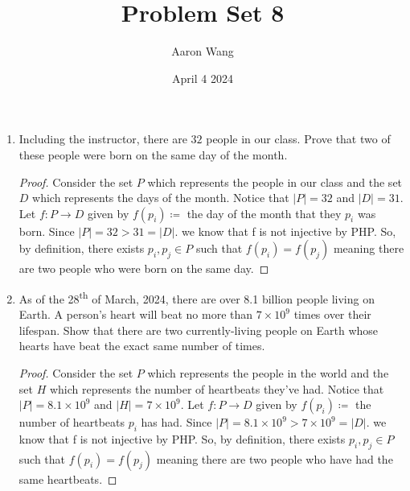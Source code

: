 \documentclass{article}
\title{Problem Set 8}
\author{Aaron Wang}
\date{April 4 2024}
\newcommand{\defeq}{\coloneqq}
\begin{document}
\maketitle

\begin{enumerate}
    \item
    Including the instructor, there are $32$ people in our class.
    Prove that two of these people were born on the same day of the month.
    \begin{proof}
    Consider the set $P$ which represents the people in our class and the set $D$ which represents the days of the month. Notice that $|P|=32$ and $|D|=31$. Let $f:P \to D$ given by $f(p_i) \defeq$ the day of the month that they $p_i$ was born.
    Since $|P|=32>31=|D|$. we know that f is not injective by PHP. So, by definition, there exists $p_i,p_j \in P$ such that $f(p_i)=f(p_j)$ meaning there are two people who were born on the same day.
    \end{proof}
  \item
    As of the 28\textsuperscript{th} of March, 2024, there are over 8.1 billion people living on Earth. A person's heart will beat no more than $7 \times 10^9$ times over their lifespan. Show that there are two currently-living people on Earth whose hearts have beat the exact same number of times.
    \begin{proof}
    Consider the set $P$ which represents the people in the world and the set $H$ which represents the number of heartbeats they've had. Notice that $|P|=8.1\times 10^9$ and $|H|=7\times 10^9$. Let $f:P \to D$ given by $f(p_i) \defeq$ the number of heartbeats $p_i$ has had.
    Since $|P|=8.1\times 10^9>7\times 10^9=|D|$. we know that f is not injective by PHP. So, by definition, there exists $p_i,p_j \in P$ such that $f(p_i)=f(p_j)$ meaning there are two people who have had the same heartbeats.
    \end{proof}


\end{enumerate}
\end{document}
